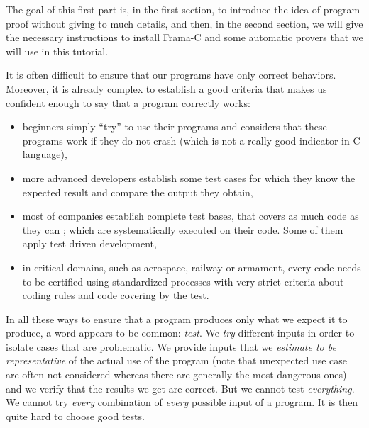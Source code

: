 \documentclass[middle]{zmdocument}
\begin{document}


The goal of this first part is, in the first section, to introduce the
idea of program proof without giving to much details, and then, in the
second section, we will give the necessary instructions to install
Frama-C and some automatic provers that we will use in this tutorial.







It is often difficult to ensure that our programs have only correct
behaviors. Moreover, it is already complex to establish a good criteria
that makes us confident enough to say that a program correctly works:



\begin{itemize}
\item
  beginners simply ``try'' to use their programs and considers that
  these programs work if they do not crash (which is not a really good
  indicator in C language),
\item
  more advanced developers establish some test cases for which they know
  the expected result and compare the output they obtain,
\item
  most of companies establish complete test bases, that covers as much
  code as they can ; which are systematically executed on their code.
  Some of them apply test driven development,
\item
  in critical domains, such as aerospace, railway or armament, every
  code needs to be certified using standardized processes with very
  strict criteria about coding rules and code covering by the test.
\end{itemize}

In all these ways to ensure that a program produces only what we expect
it to produce, a word appears to be common: \emph{test}. We \emph{try}
different inputs in order to isolate cases that are problematic. We
provide inputs that we \emph{estimate to be representative} of the
actual use of the program (note that unexpected use case are often not
considered whereas there are generally the most dangerous ones) and we
verify that the results we get are correct. But we cannot test
\emph{everything}. We cannot try \emph{every} combination of
\emph{every} possible input of a program. It is then quite hard to
choose good tests.
\end{document}
